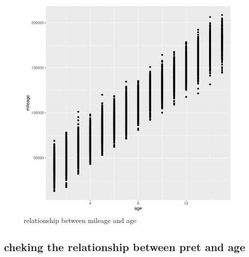 \documentclass[11pt]{book}
\begin{document}
\begin{figure}[h!]
  \centering
  \includegraphics[scale = 0.5, keepaspectratio=true]{../Figures/age_mileage_plot}
  \caption{relationship between mileage and age} \label{fig:age_mileage_plot}
\end{figure}


\clearpage
\pagebreak

\subsection*{cheking the relationship between pret and age }
\end{document}
